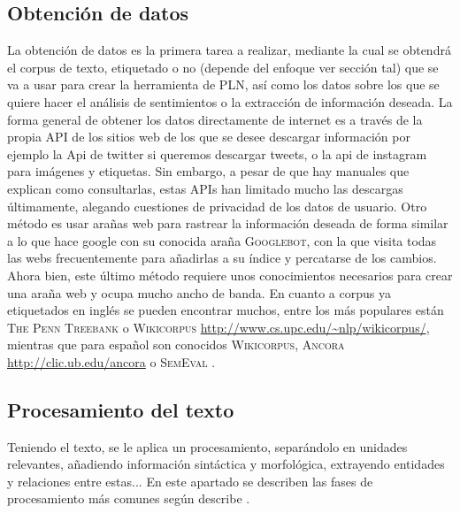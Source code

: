 \subsection{Obtención de datos}
La obtención de datos es la primera tarea a realizar, mediante la cual se obtendrá el corpus de texto, etiquetado o no (depende del enfoque ver sección tal) que se va a usar para crear la herramienta de PLN, así como los datos sobre los que se quiere hacer el análisis de sentimientos o la extracción de información deseada. \newline
La forma general de obtener los datos directamente de internet es a través de la propia API de los sitios web de los que se desee descargar información por ejemplo la Api de twitter si queremos descargar tweets, o la api de instagram para imágenes y etiquetas. Sin embargo, a pesar de que hay manuales que explican como consultarlas, estas APIs  han limitado mucho las descargas últimamente, alegando cuestiones de privacidad de los datos de usuario. Otro método es usar arañas web para rastrear la información deseada de forma similar a lo que hace google con su conocida araña \textsc{Googlebot}, con la que visita todas las webs frecuentemente para añadirlas a su índice y percatarse de los cambios. Ahora bien, este último método requiere unos conocimientos necesarios para crear una araña web y ocupa mucho ancho de banda. \newline
En cuanto a corpus ya etiquetados en inglés se pueden encontrar muchos, entre los más populares están \textsc{The Penn Treebank} \citet{marcus1993building} o \textsc{Wikicorpus} \url{http://www.cs.upc.edu/~nlp/wikicorpus/}, mientras que para español son conocidos \textsc{Wikicorpus}, \textsc{Ancora} \url{http://clic.ub.edu/ancora} o \textsc{SemEval} \citet{marquez2007semeval}. 
    
\subsection{Procesamiento del texto}
Teniendo el texto, se le aplica un procesamiento, separándolo en unidades relevantes, añadiendo información sintáctica y morfológica, extrayendo entidades y relaciones entre estas... En este apartado se describen las fases de procesamiento más comunes según describe \citet{9783319155623}.
